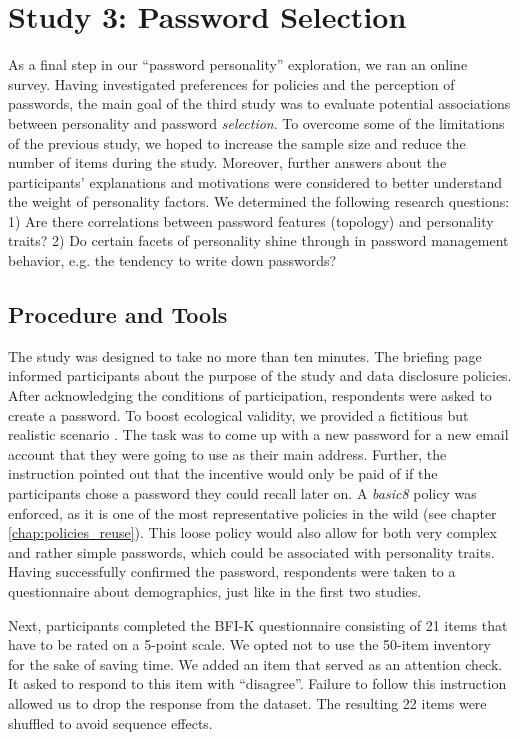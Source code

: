 \section{Study 3: Password Selection}
As a final step in our ``password personality'' exploration, we ran an online survey. Having investigated preferences for policies and the perception of passwords, the main goal of the third study was to evaluate potential associations between personality and password \textit{selection}. To overcome some of the limitations of the previous study, we hoped to increase the sample size and reduce the number of items during the study. Moreover, further answers about the participants' explanations and motivations were considered to better understand the weight of personality factors. We determined the following research questions: 1) Are there correlations between password features (topology) and personality traits? 2) Do certain facets of personality shine through in password management behavior, e.g. the tendency to write down passwords?

\subsection{Procedure and Tools}
The study was designed to take no more than ten minutes. The briefing page informed participants about the purpose of the study and data disclosure policies. After acknowledging the conditions of participation, respondents were asked to create a password. To boost ecological validity, we provided a fictitious but realistic scenario \cite{Komanduri2011OfPasswordsAndPeople}. The task was to come up with a new password for a new email account that they were going to use as their main address. Further, the instruction pointed out that the incentive would only be paid of if the participants chose a password they could recall later on. A \textit{basic8} policy was enforced, as it is one of the most representative policies in the wild (see chapter \ref{chap:policies_reuse}). This loose policy would also allow for both very complex and rather simple passwords, which could be associated with personality traits. Having successfully confirmed the password, respondents were taken to a questionnaire about demographics, just like in the first two studies. 

Next, participants completed the BFI-K questionnaire consisting of 21 items that have to be rated on a 5-point scale. We opted not to use the 50-item inventory for the sake of saving time. We added an item that served as an attention check. It asked to respond to this item with ``disagree''. Failure to follow this instruction allowed us to drop the response from the dataset. The resulting 22 items were shuffled to avoid sequence effects. 

